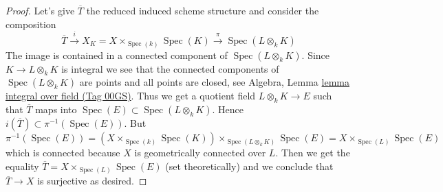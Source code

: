 \documentclass{amsart}
\theoremstyle{plain}
\theoremstyle{definition}
\theoremstyle{remark}
\numberwithin{equation}{subsection}
\def\Spec{\mathop{\mathrm{Spec}}}
\begin{document}
\begin{proof}
\medskip\noindent
Let's give $\overline{T}$ the reduced induced scheme structure
and consider the composition
$$
\overline{T} \xrightarrow{i} X_K = X \times_{\Spec(k)} \Spec(K)
\xrightarrow{\pi}
\Spec(L \otimes_k K)
$$
The image is contained in a connected component of $\Spec(L \otimes_k K)$.
Since $K \to L \otimes_k K$ is integral we see that
the connected components of $\Spec(L \otimes_k K)$
are points and all points are closed, see
Algebra, Lemma \href{https://stacks.math.columbia.edu/tag/00GS}{lemma integral over field (Tag 00GS)}.
Thus we get a quotient field $L \otimes_k K \to E$
such that $\overline{T}$ maps into $\Spec(E) \subset \Spec(L \otimes_k K)$.
Hence $i(\overline{T}) \subset \pi^{-1}(\Spec(E))$. But
$$
\pi^{-1}(\Spec(E)) =
(X \times_{\Spec(k)} \Spec(K)) \times_{\Spec(L \otimes_k K)} \Spec(E) =
X \times_{\Spec(L)} \Spec(E)
$$
which is connected because $X$ is geometrically connected over $L$.
Then we get the equality
$\overline{T} = X \times_{\Spec(L)} \Spec(E)$ (set theoretically)
and we conclude that $\overline{T} \to X$ is surjective as desired.
\end{proof}
\end{document}
